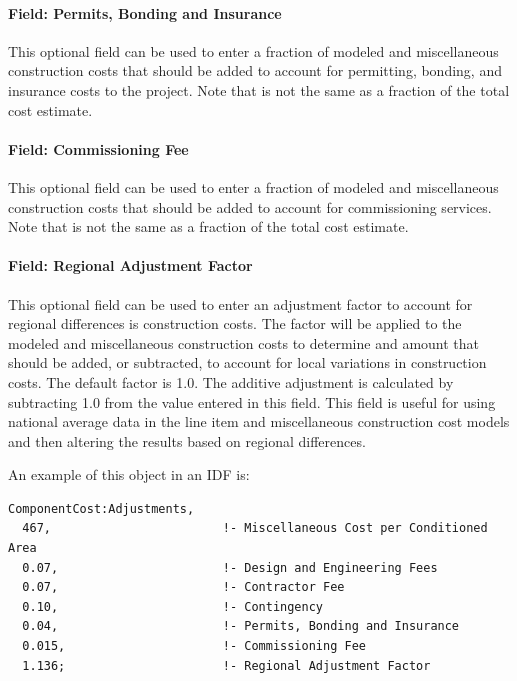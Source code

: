 \paragraph{Field: Permits, Bonding and Insurance}\label{field-permits-bonding-and-insurance}

This optional field can be used to enter a fraction of modeled and miscellaneous construction costs that should be added to account for permitting, bonding, and insurance costs to the project. Note that is not the same as a fraction of the total cost estimate.

\paragraph{Field: Commissioning Fee}\label{field-commissioning-fee}

This optional field can be used to enter a fraction of modeled and miscellaneous construction costs that should be added to account for commissioning services. Note that is not the same as a fraction of the total cost estimate.

\paragraph{Field: Regional Adjustment Factor}\label{field-regional-adjustment-factor}

This optional field can be used to enter an adjustment factor to account for regional differences is construction costs. The factor will be applied to the modeled and miscellaneous construction costs to determine and amount that should be added, or subtracted, to account for local variations in construction costs. The default factor is 1.0. The additive adjustment is calculated by subtracting 1.0 from the value entered in this field. This field is useful for using national average data in the line item and miscellaneous construction cost models and then altering the results based on regional differences.

An example of this object in an IDF is:

\begin{lstlisting}
ComponentCost:Adjustments,
  467,                        !- Miscellaneous Cost per Conditioned Area
  0.07,                       !- Design and Engineering Fees
  0.07,                       !- Contractor Fee
  0.10,                       !- Contingency
  0.04,                       !- Permits, Bonding and Insurance
  0.015,                      !- Commissioning Fee
  1.136;                      !- Regional Adjustment Factor
\end{lstlisting}

